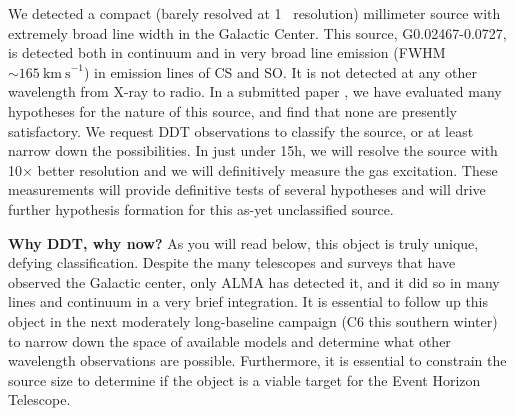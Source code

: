 \documentclass[12pt,a4paper]{article}  %
\newcommand{\kms}{\ensuremath{\mathrm{km~s}^{-1}}\xspace}
\begin{document}
%
We detected a compact (barely resolved at 1\arcsec~ resolution) millimeter source with extremely broad line width in the Galactic Center.
This source, G0.02467-0.0727, is detected both in continuum and in very broad line emission (FWHM $\sim165~\kms$) in emission lines of CS and SO.
It is not detected at any other wavelength from X-ray to radio.
In a submitted paper \citep{Ginsburg2024}, we have evaluated many hypotheses for the nature of this source, and find that none are presently satisfactory.
We request DDT observations to classify the source, or at least narrow down the possibilities.
In just under 15h, we will resolve the source with 10$\times$ better resolution and we will definitively measure the gas excitation.
These measurements will provide definitive tests of several hypotheses and will drive further hypothesis formation for this as-yet unclassified source.

\textbf{Why DDT, why now?}
As you will read below, this object is truly unique, defying classification.
Despite the many telescopes and surveys that have observed the Galactic center, only ALMA has detected it, and it did so in many lines and continuum in a very brief integration.
It is essential to follow up this object in the next moderately long-baseline campaign (C6 this southern winter) to narrow down the space of available models and determine what other wavelength observations are possible.
Furthermore, it is essential to constrain the source size to determine if the object is a viable target for the Event Horizon Telescope.
\end{document}
